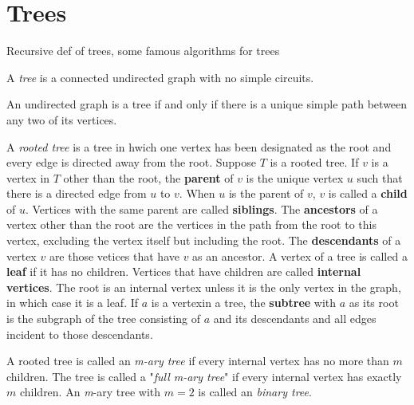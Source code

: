 


\chapter {Trees}
Recursive def of trees, some famous algorithms for trees

\begin{definition}[Tree]
A \textit{tree} is a connected undirected graph with no simple circuits.
\end{definition}

\begin{theorem}
An undirected graph is a tree if and only if there is a unique simple path between any two of its vertices.
\end{theorem}

\begin{definition}
A \textit{rooted tree} is a tree in hwich one vertex has been designated as the root and every edge is directed away from the root. Suppose $T$ is a rooted tree. If $v$ is a vertex in $T$ other than the root, the \textbf{parent} of $v$ is the unique vertex $u$ such that there is a directed edge from $u$ to $v$. When $u$ is the parent of $v$, $v$ is called a \textbf{child} of $u$. Vertices with the same parent are called \textbf{siblings}. The \textbf{ancestors} of a vertex other than the root are the vertices in the path from the root to this vertex, excluding the vertex itself but including the root. The \textbf{descendants} of a vertex $v$ are those vetices that have $v$ as an ancestor. A vertex of a tree is called a \textbf{leaf} if it has no children. Vertices that have children are called \textbf{internal vertices}. The root is an internal vertex unless it is the only vertex in the graph, in which case it is a leaf. If $a$ is a vertexin a tree, the \textbf{subtree} with $a$ as its root is the subgraph of the tree consisting of $a$ and its descendants and all edges incident to those descendants.
\end{definition}

\begin{definition}
A rooted tree is called an \textit{m-ary tree} if every internal vertex has no more than $m$ children. The tree is called a "\textit{full m-ary tree}" if every internal vertex has exactly $m$ children. An \textit{m}-ary tree with $m=2$ is called an \textit{binary tree}. 
\end{definition} 

